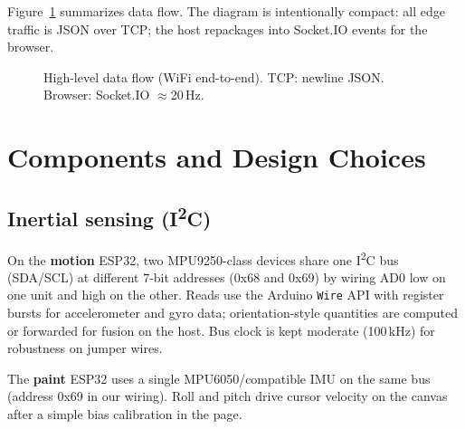 \documentclass[10pt,twocolumn]{article}
\begin{document}
Figure~\ref{fig:block} summarizes data flow. The diagram is intentionally compact: all edge
traffic is JSON over TCP; the host repackages into Socket.IO events for the browser.

\begin{figure}[H]
\centering
{}
\caption{High-level data flow (WiFi end-to-end). TCP: newline JSON. Browser: Socket.IO $\approx$20\,Hz.}
\label{fig:block}
\end{figure}

\section{Components and Design Choices}

\subsection{Inertial sensing (I\textsuperscript{2}C)}

On the \textbf{motion} ESP32, two MPU9250-class devices share one I\textsuperscript{2}C bus
(SDA/SCL) at different 7-bit addresses (0x68 and 0x69) by wiring AD0 low on one unit and high on
the other. Reads use the Arduino \texttt{Wire} API with register bursts for accelerometer and gyro
data; orientation-style quantities are computed or forwarded for fusion on the host. Bus clock is
kept moderate (100\,kHz) for robustness on jumper wires.

The \textbf{paint} ESP32 uses a single MPU6050/compatible IMU on the same bus (address 0x69 in
our wiring). Roll and pitch drive cursor velocity on the canvas after a simple bias calibration
in the page.
\end{document}
